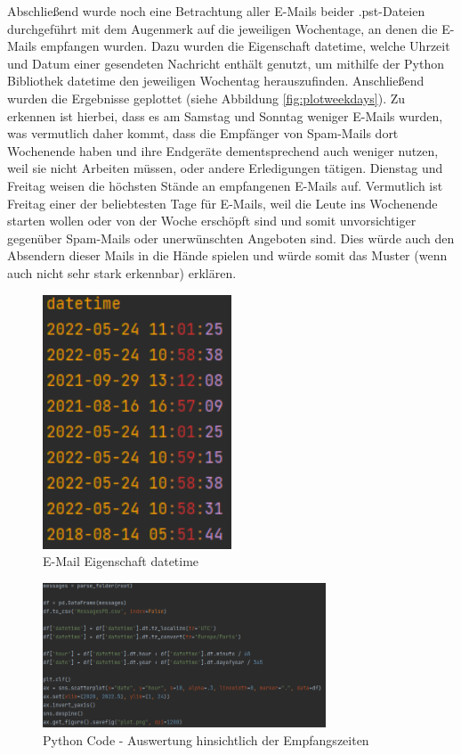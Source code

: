 \noindent Abschließend wurde noch eine Betrachtung aller E-Mails beider .pst-Dateien durchgeführt mit dem Augenmerk auf die jeweiligen Wochentage, an denen die E-Mails empfangen wurden. Dazu wurden die Eigenschaft \glqq{}datetime\grqq{}, welche Uhrzeit und Datum einer gesendeten Nachricht enthält genutzt, um mithilfe der Python Bibliothek datetime den jeweiligen Wochentag herauszufinden. Anschließend wurden die Ergebnisse geplottet (siehe Abbildung \ref{fig:plotweekdays}). Zu erkennen ist hierbei, dass es am Samstag und Sonntag weniger E-Mails wurden, was vermutlich daher kommt, dass die Empfänger von Spam-Mails dort Wochenende haben und ihre Endgeräte dementsprechend auch weniger nutzen, weil sie nicht Arbeiten müssen, oder andere Erledigungen tätigen. Dienstag und Freitag weisen die höchsten Stände an empfangenen E-Mails auf. Vermutlich ist Freitag einer der beliebtesten Tage für E-Mails, weil die Leute ins Wochenende starten wollen oder von der Woche erschöpft sind und somit unvorsichtiger gegenüber Spam-Mails oder unerwünschten Angeboten sind. Dies würde auch den Absendern dieser Mails in die Hände spielen und würde somit das Muster (wenn auch nicht sehr stark erkennbar) erklären.

\begin{figure}
    \centering
    \includegraphics[width=0.50\textwidth]{images/datetime.PNG}
    \caption{E-Mail Eigenschaft datetime} 
    \label{fig:datetime}
\end{figure}

\begin{figure}
    \centering
    \includegraphics[width=0.75\textwidth]{images/Auswertung_Zeiten.PNG}
    \caption{Python Code - Auswertung hinsichtlich der Empfangszeiten} 
    \label{fig:emailsdatetime}
\end{figure}

